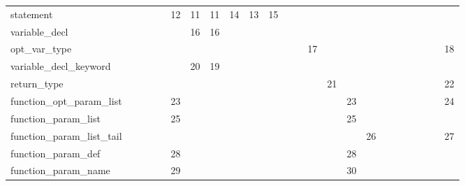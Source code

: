 \begin{table}[htbp]
\begin{tabular}{l|ccccccccccccccccccccccc}
statement                   &                   &          &          &      & 12 & 11    & 11    & 14      & 13   & 15       &        &      &     &                    &      &     &     &       &          &          &     &       &         \\
variable\_decl              &                   &          &          &      &    & 16    & 16    &         &      &          &        &      &     &                    &      &     &     &       &          &          &     &       &         \\
opt\_var\_type              &                   &          &          &      &    &       &       &         &      &          &        &      & 17  &                    &      &     &     &       &          &          &     &       & 18      \\
variable\_decl\_keyword     &                   &          &          &      &    & 20    & 19    &         &      &          &        &      &     &                    &      &     &     &       &          &          &     &       &         \\
return\_type                &                   &          &          &      &    &       &       &         &      &          &        &      &     & 21                 &      &     &     &       &          &          &     &       & 22      \\
function\_opt\_param\_list  &                   &          &          &      & 23 &       &       &         &      &          &        &      &     &                    & 23   &     &     &       &          &          &     &       & 24      \\
function\_param\_list       &                   &          &          &      & 25 &       &       &         &      &          &        &      &     &                    & 25   &     &     &       &          &          &     &       &         \\
function\_param\_list\_tail &                   &          &          &      &    &       &       &         &      &          &        &      &     &                    &      & 26  &     &       &          &          &     &       & 27      \\
function\_param\_def        &                   &          &          &      & 28 &       &       &         &      &          &        &      &     &                    & 28   &     &     &       &          &          &     &       &         \\
function\_param\_name       &                   &          &          &      & 29 &       &       &         &      &          &        &      &     &                    & 30   &     &     &       &          &          &     &       &         \\

\end{tabular}
\end{table}
